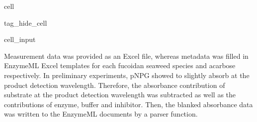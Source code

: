 \documentclass[letterpaper,12pt,english]{jupyterBook}
\begin{document}
\begin{sphinxuseclass}{cell}
\begin{sphinxuseclass}{tag_hide_cell}
\begin{sphinxVerbatimInput}
\begin{sphinxuseclass}{cell_input}
\begin{sphinxVerbatim}[commandchars=\\\{\}]
       

         
            
            
                 

     

 
       
          
             
\end{sphinxVerbatim}

\end{sphinxuseclass}\end{sphinxVerbatimInput}

\end{sphinxuseclass}
\end{sphinxuseclass}
\sphinxAtStartPar
Measurement data was provided as an Excel file, whereas metadata was filled in EnzymeML Excel templates for each fucoidan seaweed species and acarbose respectively. In preliminary experiments, p\sphinxhyphen{}NPG showed to slightly absorb at the product detection wavelength. Therefore, the absorbance contribution of substrate at the product detection wavelength was subtracted as well as the contributions of enzyme, buffer and inhibitor. Then, the blanked absorbance data was written to the EnzymeML documents by a parser function.
\end{document}
